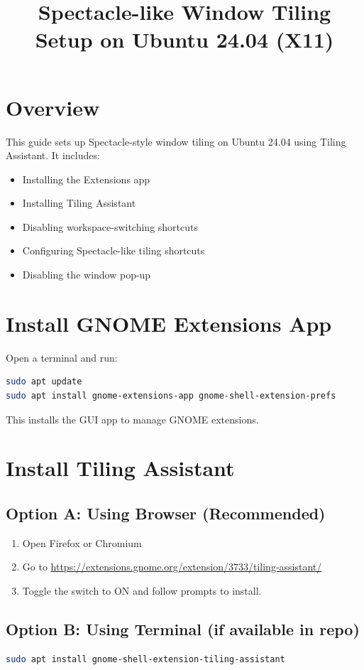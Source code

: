 \documentclass[12pt]{article}
\title{Spectacle-like Window Tiling Setup on Ubuntu 24.04 (X11)}
\author{}
\date{}
\begin{document}
\maketitle

\section*{Overview}
This guide sets up Spectacle-style window tiling on Ubuntu 24.04 using Tiling Assistant. It includes:
\begin{itemize}
    \item Installing the Extensions app
    \item Installing Tiling Assistant
    \item Disabling workspace-switching shortcuts
    \item Configuring Spectacle-like tiling shortcuts
    \item Disabling the window pop-up
\end{itemize}

\section{Install GNOME Extensions App}
Open a terminal and run:
\begin{lstlisting}[language=bash]
sudo apt update
sudo apt install gnome-extensions-app gnome-shell-extension-prefs
\end{lstlisting}
This installs the GUI app to manage GNOME extensions.

\section{Install Tiling Assistant}
\subsection*{Option A: Using Browser (Recommended)}
\begin{enumerate}
    \item Open Firefox or Chromium
    \item Go to \url{https://extensions.gnome.org/extension/3733/tiling-assistant/}
    \item Toggle the switch to ON and follow prompts to install.
\end{enumerate}

\subsection*{Option B: Using Terminal (if available in repo)}
\begin{lstlisting}[language=bash]
sudo apt install gnome-shell-extension-tiling-assistant
\end{lstlisting}
\end{document}
